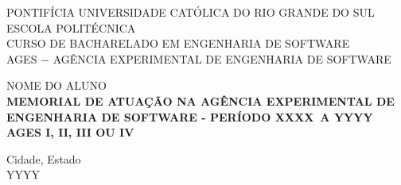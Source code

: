 \author{Gustavo}

\def\autor{\uppercase{Nome do Aluno}}
\def\inicio{XXXX}
\def\fim{YYYY}
\def\ages{I, II, III ou IV}
\def\local{Cidade, Estado}
\def\ano{YYYY}

\begin{capa}
  \centering
    \uppercase{
      PONTIFÍCIA UNIVERSIDADE CATÓLICA DO RIO GRANDE DO SUL\\
      ESCOLA POLITÉCNICA\\
      CURSO DE BACHARELADO EM ENGENHARIA DE SOFTWARE\\
      AGES $-$ AGÊNCIA EXPERIMENTAL DE ENGENHARIA DE SOFTWARE\\
      }

    \vfill
    \autor\\
    \vfill
    \textbf{
      \uppercase{
        Memorial de atuação na Agência Experimental de Engenharia de Software
        {-} Período \inicio\ a \fim\
        \\AGES \ages\
      }
    }

    \vfill

    \vfill
    \local\\
    \ano\
  \end{capa}